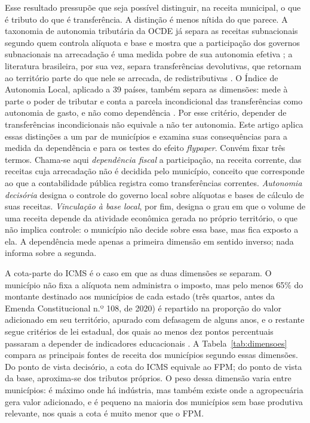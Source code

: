 Esse resultado pressupõe que seja possível distinguir, na receita municipal, o que é tributo do que é transferência. A distinção é menos nítida do que parece. A taxonomia de autonomia tributária da OCDE já separa as receitas subnacionais segundo quem controla alíquota e base e mostra que a participação dos governos subnacionais na arrecadação é uma medida pobre de sua autonomia efetiva \citep{BlochligerKing2006}; a literatura brasileira, por sua vez, separa transferências devolutivas, que retornam ao território parte do que nele se arrecada, de redistributivas \citep{daCosta2024}. O Índice de Autonomia Local, aplicado a 39 países, também separa as dimensões: mede à parte o poder de tributar e conta a parcela incondicional das transferências como autonomia de gasto, e não como dependência \citep{Ladner2016}. Por esse critério, depender de transferências incondicionais não equivale a não ter autonomia. Este artigo aplica essas distinções a um par de municípios e examina suas consequências para a medida da dependência e para os testes do efeito \textit{flypaper}. Convém fixar três termos. Chama-se aqui \textit{dependência fiscal} a participação, na receita corrente, das receitas cuja arrecadação não é decidida pelo município, conceito que corresponde ao que a contabilidade pública registra como transferências correntes. \textit{Autonomia decisória} designa o controle do governo local sobre alíquotas e bases de cálculo de suas receitas. \textit{Vinculação à base local}, por fim, designa o grau em que o volume de uma receita depende da atividade econômica gerada no próprio território, o que não implica controle: o município não decide sobre essa base, mas fica exposto a ela. A dependência mede apenas a primeira dimensão em sentido inverso; nada informa sobre a segunda.

A cota-parte do ICMS é o caso em que as duas dimensões se separam. O município não fixa a alíquota nem administra o imposto, mas pelo menos 65\% do montante destinado aos municípios de cada estado (três quartos, antes da Emenda Constitucional n.º 108, de 2020) é repartido na proporção do valor adicionado em seu território, apurado com defasagem de alguns anos, e o restante segue critérios de lei estadual, dos quais ao menos dez pontos percentuais passaram a depender de indicadores educacionais \citep{CF1988art158, Sasso2021}. A Tabela~\ref{tab:dimensoes} compara as principais fontes de receita dos municípios segundo essas dimensões. Do ponto de vista decisório, a cota do ICMS equivale ao FPM; do ponto de vista da base, aproxima-se dos tributos próprios. O peso dessa dimensão varia entre municípios: é máximo onde há indústria, mas também existe onde a agropecuária gera valor adicionado, e é pequeno na maioria dos municípios sem base produtiva relevante, nos quais a cota é muito menor que o FPM.

